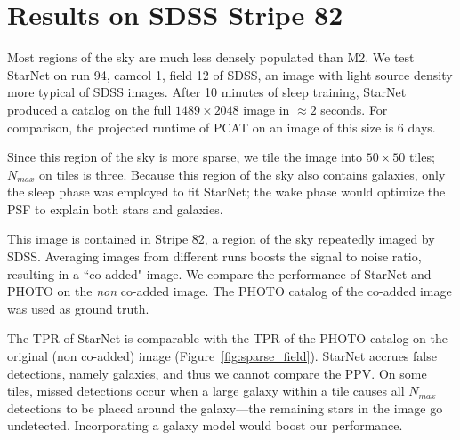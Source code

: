 \section{Results on SDSS Stripe 82}
\label{sec:results_sparse_field}

Most regions of the sky are much less densely populated than M2.
We test StarNet on run 94, camcol 1, field 12 of SDSS,
an image with light source density more typical of SDSS images.
After 10 minutes of sleep training, StarNet produced a catalog on the full $1489\times 2048$ image in $\approx2$ seconds.
For comparison, the projected runtime of PCAT on an image of this size is 6 days.

Since this region of the sky is more sparse, we tile the image into $50\times 50$ tiles; $N_{max}$ on tiles is three.
Because this region of the sky also contains galaxies, only the sleep phase was employed to fit StarNet;
the wake phase would optimize the PSF to explain both stars and galaxies.

This image is contained in Stripe 82, a region of the sky repeatedly imaged by SDSS.
Averaging images from different runs boosts the signal to noise ratio, resulting in a ``co-added" image.
We compare the performance of StarNet and PHOTO on the {\itshape non} co-added image.
The PHOTO catalog of the co-added image was used as ground truth.

The TPR of StarNet is comparable with the TPR of the PHOTO catalog on the original (non co-added) image (Figure~\ref{fig:sparse_field}).
StarNet accrues false detections, namely galaxies, and thus we cannot compare the PPV.
On some tiles, missed detections occur when a large galaxy within a tile causes all $N_{max}$ detections to be placed around the galaxy---the remaining stars in the image go undetected.
Incorporating a galaxy model would boost our performance.


